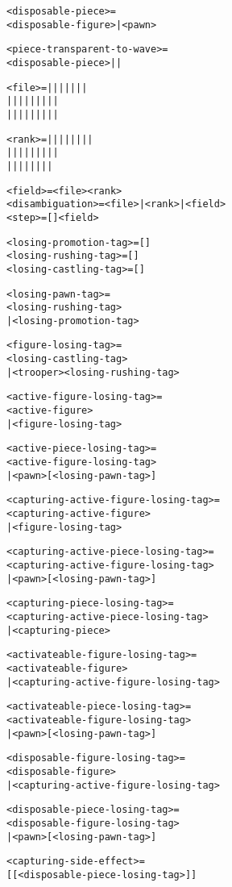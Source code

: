 \begin{alltt}
<disposable-piece> =
  <disposable-figure> | <pawn>

<piece-transparent-to-wave> =
  <disposable-piece> |  | 

<file> =  |  |  |  |  |  |  | 
|  |  |  |  |  |  |  |  | 
|  |  |  |  |  |  |  |  | 

<rank> =  |  |  |  |  |  |  |  | 
|  |  |  |  |  |  |  |  | 
|  |  |  |  |  |  |  | 

<field> = <file><rank>
<disambiguation> = <file> | <rank> | <field>
<step> = []<field>

<losing-promotion-tag> = [\alg{==}]
<losing-rushing-tag> = [\alg{::}]
<losing-castling-tag> = [\alg{\&\&}]

<losing-pawn-tag> =
  <losing-rushing-tag>
| <losing-promotion-tag>

<figure-losing-tag> =
  <losing-castling-tag>
| <trooper><losing-rushing-tag>

<active-figure-losing-tag> =
  <active-figure>
| <figure-losing-tag>
\end{alltt}

\clearpage %

\begin{alltt}
<active-piece-losing-tag> =
  <active-figure-losing-tag>
| <pawn>[<losing-pawn-tag>]

<capturing-active-figure-losing-tag> =
  <capturing-active-figure>
| <figure-losing-tag>

<capturing-active-piece-losing-tag> =
  <capturing-active-figure-losing-tag>
| <pawn>[<losing-pawn-tag>]

<capturing-piece-losing-tag> =
  <capturing-active-piece-losing-tag>
| <capturing-piece>

<activateable-figure-losing-tag> =
  <activateable-figure>
| <capturing-active-figure-losing-tag>

<activateable-piece-losing-tag> =
  <activateable-figure-losing-tag>
| <pawn>[<losing-pawn-tag>]

<disposable-figure-losing-tag> =
  <disposable-figure>
| <capturing-active-figure-losing-tag>

<disposable-piece-losing-tag> =
  <disposable-figure-losing-tag>
| <pawn>[<losing-pawn-tag>]

<capturing-side-effect> =
  [\alg{*}[<disposable-piece-losing-tag>]]
\end{alltt}

